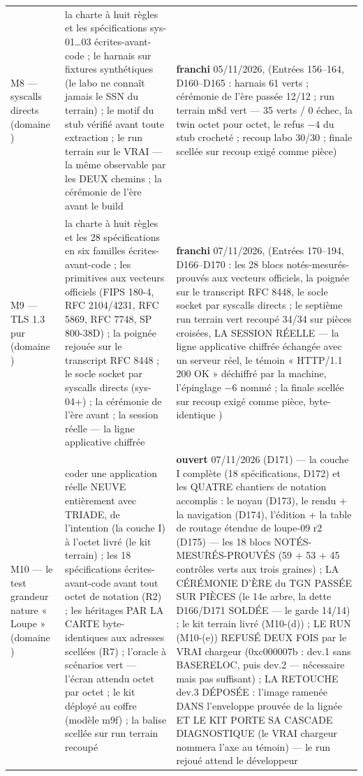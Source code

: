 \begin{table}[htbp]
\begin{tabularx}{\textwidth}{@{}l Y >{\raggedright\arraybackslash}p{2.6cm}@{}}
M8 — syscalls directs (domaine ) & la charte à huit règles et les spécifications sys-01…03 écrites-avant-code ; le harnais sur fixtures  synthétiques (le labo ne connaît jamais le SSN du terrain) ; le motif du stub vérifié avant toute extraction ; le run terrain sur le VRAI  — la même observable par les DEUX chemins ; la cérémonie de l'ère avant le build & \textbf{franchi} 05/11/2026,  (Entrées 156--164, D160--D165 : harnais 61 verts ; cérémonie de l'ère passée 12/12 ; run terrain m8d vert — 35 verts / 0 échec, la twin octet pour octet, le refus $-4$ du stub crocheté ; recoup labo 30/30 ; finale scellée sur recoup exigé comme pièce) \\
M9 — TLS 1.3 pur (domaine ) & la charte à huit règles et les 28 spécifications en six familles écrites-avant-code ; les primitives aux vecteurs officiels (FIPS 180-4, RFC 2104/4231, RFC 5869, RFC 7748, SP 800-38D) ; la poignée rejouée sur le transcript RFC 8448 ; le socle socket par syscalls directs (sys-04+) ; la cérémonie de l'ère avant  ; la session réelle — la ligne applicative chiffrée & \textbf{franchi} 07/11/2026,  (Entrées 170--194, D166--D170 : les 28 blocs notés-mesurés-prouvés aux vecteurs officiels, la poignée sur le transcript RFC 8448, le socle socket par syscalls directs ; le septième run terrain vert recoupé 34/34 sur pièces croisées, LA SESSION RÉELLE — la ligne applicative chiffrée échangée avec un serveur réel, le témoin « HTTP/1.1 200 OK » déchiffré par la machine, l'épinglage $-6$ nommé ; la finale scellée sur recoup exigé comme pièce,  byte-identique ) \\
M10 — le test grandeur nature « Loupe » (domaine ) & coder une application réelle NEUVE entièrement avec TRIADE, de l'intention (la couche I) à l'octet livré (le kit terrain) ; les 18 spécifications écrites-avant-code avant tout octet de notation (R2) ; les héritages PAR LA CARTE byte-identiques aux adresses scellées (R7) ; l'oracle à scénarios vert — l'écran attendu octet par octet ; le kit déployé au coffre  (modèle m9f) ; la balise  scellée sur run terrain recoupé & \textbf{ouvert} 07/11/2026 (D171) — la couche I complète (18 spécifications, D172) et les QUATRE chantiers de notation accomplis : le noyau (D173), le rendu + la navigation (D174), l'édition + la table de routage étendue de loupe-09 r2 (D175) — les 18 blocs NOTÉS-MESURÉS-PROUVÉS (59 + 53 + 45 contrôles verts aux trois graines) ; LA CÉRÉMONIE D'ÈRE du TGN PASSÉE SUR PIÈCES (le 14e arbre, la dette D166/D171 SOLDÉE — le garde 14/14) ; le kit terrain livré (M10-(d)) ; LE RUN (M10-(e)) REFUSÉ DEUX FOIS par le VRAI chargeur (0xc000007b : dev.1 sans BASERELOC, puis dev.2 — nécessaire mais pas suffisant) ; LA RETOUCHE dev.3 DÉPOSÉE : l'image ramenée DANS l'enveloppe prouvée de la lignée ET LE KIT PORTE SA CASCADE DIAGNOSTIQUE (le VRAI chargeur nommera l'axe au témoin) — le run rejoué attend le développeur \\
\bottomrule
\end{tabularx}
\end{table}

